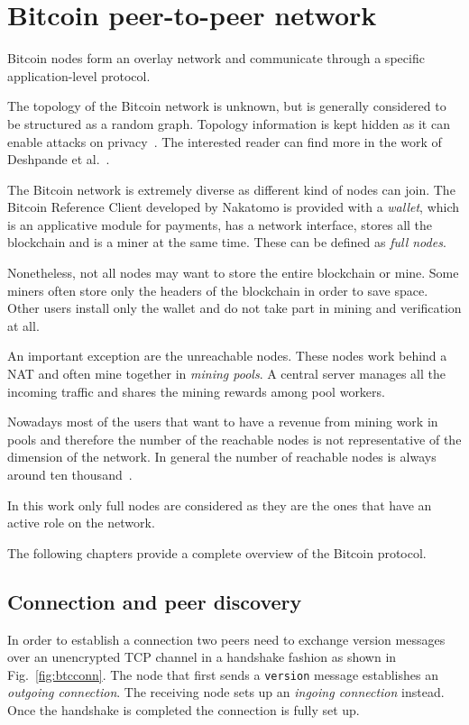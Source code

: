 \chapter{Bitcoin peer-to-peer network}
\label{sec:netintro}

Bitcoin nodes form an overlay network and communicate through a specific application-level protocol.

The topology of the Bitcoin network is unknown, but is generally considered to be structured as a random graph. Topology information is kept hidden as it can enable attacks on privacy~\cite{biryukov2014deanonymisation}. The interested reader can find more in the work of Deshpande et al.~\cite{Deshpande2018BTCmapMB}.\par

The Bitcoin network is extremely diverse as different kind of nodes can join. The Bitcoin Reference Client developed by Nakatomo is provided with a \textit{wallet}, which is an applicative module for payments, has a network interface, stores all the blockchain and is a miner at the same time. These can be defined as \textit{full nodes}.

Nonetheless, not all nodes may want to store the entire blockchain or mine. Some miners often store only the headers of the blockchain in order to save space. Other users install only the wallet and do not take part in mining and verification at all.

An important exception are the unreachable nodes. These nodes work behind a NAT and often mine together in \textit{mining pools}. A central server manages all the incoming traffic and shares the mining rewards among pool workers.

Nowadays most of the users that want to have a revenue from mining work in pools and therefore the number of the reachable nodes is not representative of the dimension of the network. In general the number of reachable nodes is always around ten thousand~\cite{totknownfullnodes}.\par

In this work only full nodes are considered as they are the ones that have an active role on the network.

The following chapters provide a complete overview of the Bitcoin protocol.

\section{Connection and peer discovery}\label{sec:peerdisc}
In order to establish a connection two peers need to exchange version messages over an unencrypted TCP channel in a handshake fashion as shown in Fig.~\ref{fig:btcconn}. The node that first sends a \texttt{version} message establishes an \emph{outgoing connection}. The receiving node sets up an \emph{ingoing connection} instead. Once the handshake is completed the connection is fully set up.

